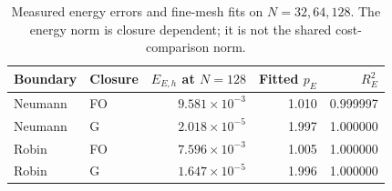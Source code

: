 \begin{table}[htbp]
\centering
\small
\setlength{\tabcolsep}{4pt}
\begin{tabular}{llrrr}
\toprule
Boundary & Closure & $E_{E,h}$ at $N=128$ & Fitted $p_E$ & $R_E^2$ \\
\midrule
Neumann & FO & $9.581\times10^{-3}$ & 1.010 & 0.999997 \\
Neumann & G & $2.018\times10^{-5}$ & 1.997 & 1.000000 \\
Robin & FO & $7.596\times10^{-3}$ & 1.005 & 1.000000 \\
Robin & G & $1.647\times10^{-5}$ & 1.996 & 1.000000 \\
\bottomrule
\end{tabular}
\caption{Measured energy errors and fine-mesh fits on $N=32,64,128$. The energy norm is closure dependent; it is not the shared cost-comparison norm.}
\label{tab:energy-summary}
\end{table}
